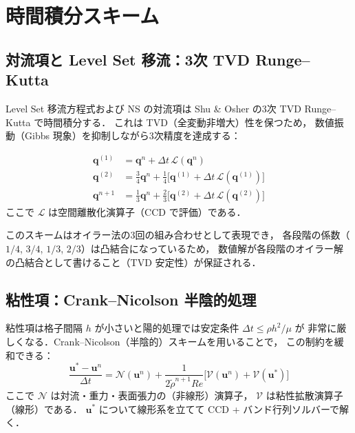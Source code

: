 \documentclass[12pt, a4paper, titlepage]{article}
\newcommand{\jp}[1]{{\normalfont\jpfont #1}}
\newcommand{\bu}{\bm{u}}
\begin{document}
\section{\jp{時間積分スキーム}}
\label{sec:time}

\subsection{\jp{対流項と Level Set 移流：3次 TVD Runge--Kutta}}

\jp{Level Set 移流方程式および NS の対流項は
Shu \& Osher \cite{ShuOsher1988} の3次 TVD Runge--Kutta で時間積分する．
これは TVD（全変動非増大）性を保つため，
数値振動（Gibbs 現象）を抑制しながら3次精度を達成する：}

\begin{tcolorbox}[mybox, title={3\jp{次} TVD Runge--Kutta \jp{（Shu--Osher スキーム）}}]
\begin{align}
  \bm{q}^{(1)} &= \bm{q}^n + \Delta t\,\mathcal{L}(\bm{q}^n)
  \label{eq:TVDRK3_1}\\[4pt]
  \bm{q}^{(2)} &= \frac{3}{4}\bm{q}^n
               + \frac{1}{4}\bigl[\bm{q}^{(1)} + \Delta t\,\mathcal{L}(\bm{q}^{(1)})\bigr]
  \label{eq:TVDRK3_2}\\[4pt]
  \bm{q}^{n+1} &= \frac{1}{3}\bm{q}^n
               + \frac{2}{3}\bigl[\bm{q}^{(2)} + \Delta t\,\mathcal{L}(\bm{q}^{(2)})\bigr]
  \label{eq:TVDRK3_3}
\end{align}
\jp{ここで $\mathcal{L}$ は空間離散化演算子（CCD で評価）である．}
\end{tcolorbox}

\jp{このスキームはオイラー法の3回の組み合わせとして表現でき，
各段階の係数（$1/4$, $3/4$, $1/3$, $2/3$）は凸結合になっているため，
数値解が各段階のオイラー解の凸結合として書けること（TVD 安定性）が保証される．}

\subsection{\jp{粘性項：Crank--Nicolson 半陰的処理}}

\jp{粘性項は格子間隔 $h$ が小さいと陽的処理では安定条件 $\Delta t \leq \rho h^2/\mu$ が
非常に厳しくなる．Crank--Nicolson（半陰的）スキームを用いることで，
この制約を緩和できる：}
\begin{equation}
  \frac{\bu^* - \bu^n}{\Delta t}
  = \mathcal{N}(\bu^n)
  + \frac{1}{2\tilde\rho^{n+1} Re}\bigl[\mathcal{V}(\bu^n) + \mathcal{V}(\bu^*)\bigr]
  \label{eq:CN}
\end{equation}
\jp{ここで $\mathcal{N}$ は対流・重力・表面張力の（非線形）演算子，
$\mathcal{V}$ は粘性拡散演算子（線形）である．
$\bu^*$ について線形系を立てて CCD + バンド行列ソルバーで解く．}
\end{document}
